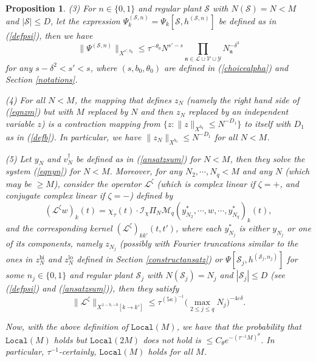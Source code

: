 \documentclass[11 pt,reqno]{amsart}
\newtheorem{prop}[thm]{Proposition}
\theoremstyle{definition}
\theoremstyle{remark}
\numberwithin{equation}{section}
\newcommand{\Sc}{\mathcal{S}}
\newcommand{\Lc}{\mathcal{L}}
\newcommand{\Ic}{\mathcal{I}}
\newcommand{\Vc}{\mathcal{V}}
\renewcommand{\Mc}{\mathcal{M}}
\newcommand{\Yc}{\mathcal{Y}}
\newcommand{\nf}{\mathfrak{n}}
\newcommand{\Ls}{\mathscr{L}}
\begin{document}
{\begin{prop}
 (3) For $n\in\{0,1\}$ and regular plant $\Sc$ with $N(\Sc)=N<M$ and $|\Sc|\leq D$, let the expression $\Psi_{k}^{(\Sc,n)}=\Psi_k[\Sc,h^{(\Sc,n)}]$ be defined as in (\ref{defpsi}), then we have
 \begin{equation}\label{psibd}\|\Psi^{(\Sc,n)}\|_{X^{s',b_0}}\leq\tau^{-\theta_0}N^{s'-s}\prod_{\nf\in\Lc\cup\Vc\cup\Yc}N_\nf^{-\delta^3}
 \end{equation} for any $s-\delta^2<s'<s$, where $(s,b_0,\theta_0)$ are defined in (\ref{choicealpha}) and Section \ref{notations}.
 
  (4) For all $N<M$, the mapping that defines $z_N$ (namely the right hand side of (\ref{eqnzm}) but with $M$ replaced by $N$ and then $z_N$ replaced by an independent variable $z$) is a contraction mapping from $\{z:\|z\|_{X^{b_0}}\leq N^{-D_1}\}$ to itself with $D_1$ as in (\ref{defb}). In particular, we have $\|z_N\|_{X^{b_0}}\leq N^{-D_1}$ for all $N<M$.
 
 (5) Let $y_{N}$ and $v_{N}^\dagger$ be defined as in (\ref{ansatzsum}) for $N<M$, then they solve the system (\ref{eqnyn}) for $N<M$. Moreover, for any $N_2,\cdots,N_{q}< M$ and any $N$ (which may be $\geq M$), consider the operator $\Ls^\zeta$ (which is complex linear if $\zeta=+$, and conjugate complex linear if $\zeta=-$) defined by
 \begin{equation}\label{deflinoper}(\Ls^\zeta w)_k(t)=\chi_\tau(t)\cdot\Ic_\chi\Pi_N\Mc_q(y_{N_2}^*,\cdots,w,\cdots, y_{N_{q}}^*)_k(t),
 \end{equation} and the corresponding kernel $(\Ls^\zeta)_{kk'}(t,t')$, where each $y_{N_j}^*$ is either $y_{N_j}$ or one of its components, namely $z_{N_j}$ (possibly with Fourier truncations similar to the ones in $z_N^{\mathrm{hi}}$ and $z_N^{\mathrm{lo}}$ defined in Section \ref{constructansatz}) or $\Psi[\Sc_j,h^{(\Sc_j,n_j)}]$ for some $n_j\in\{0,1\}$ and regular plant $\Sc_j$ with $N(\Sc_j)=N_j$ and $|\Sc_j|\leq D$ (see (\ref{defpsi}) and (\ref{ansatzsum})), then they satisfy
 \begin{equation}\label{linbd}\|\Ls^\zeta\|_{X^{1-b,-b}[k\to k']}\leq \tau^{(5\kappa)^{-1}}\big(\max_{2\leq j\leq q}N_j\big)^{-4\varepsilon\delta}.
 \end{equation}
 
Now, with the above definition of $\mathtt{Local}(M)$, we have that \emph{the probability that $\mathtt{Local}(M)$ holds but $\mathtt{Local}(2M)$ does not hold} is $\leq C_\theta e^{-(\tau^{-1}M)^\theta}$. In particular, $\tau^{-1}$-certainly, $\mathtt{Local}(M)$ holds for all $M$.
  \end{prop}
}
\end{document}
